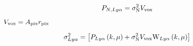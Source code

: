 \begin{equation}
P_{N, Ly\alpha} = \sigma_{\rm N}^2 V_{\rm vox}
\end{equation}

$V_{\rm vox} = A_{\rm pix} r_{\rm pix}$

\begin{equation}
\sigma_{Ly\alpha}^2 = \left[ P_{Ly\alpha}\left(k, \mu \right) + \sigma_{\rm N}^2 V_{\rm vox} {\rm W}_{Ly\alpha}\left(k, \mu \right) \right]
\end{equation}
